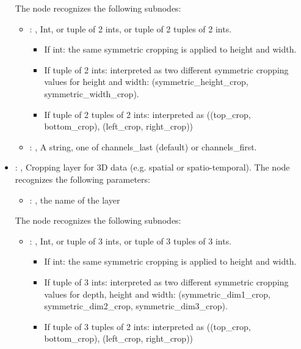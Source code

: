 \begin{itemize}
      The  node recognizes the following subnodes:
      \begin{itemize}
        \item {}: , 
          Int, or tuple of 2 ints, or tuple of 2 tuples of 2 ints.         \begin{itemize}
          \item If int: the same symmetric cropping is applied to height and width.           \item
          If tuple of 2 ints: interpreted as two different symmetric cropping values for height and
          width:             (symmetric\_height\_crop, symmetric\_width\_crop).           \item If
          tuple of 2 tuples of 2 ints: interpreted as ((top\_crop, bottom\_crop), (left\_crop,
          right\_crop))         \end{itemize}

        \item {}: , 
          A string, one of channels\_last (default) or channels\_first.
      \end{itemize}

    \item {}: , 
      Cropping layer for 3D data (e.g. spatial or spatio-temporal).
      The  node recognizes the following parameters:
        \begin{itemize}
          \item {}: , 
            the name of the layer
      \end{itemize}

      The  node recognizes the following subnodes:
      \begin{itemize}
        \item {}: , 
          Int, or tuple of 3 ints, or tuple of 3 tuples of 3 ints.         \begin{itemize}
          \item If int: the same symmetric cropping is applied to height and width.           \item
          If tuple of 3 ints: interpreted as two different symmetric cropping values for depth,
          height and width:             (symmetric\_dim1\_crop, symmetric\_dim2\_crop,
          symmetric\_dim3\_crop).           \item If tuple of 3 tuples of 2 ints: interpreted as
          ((top\_crop, bottom\_crop), (left\_crop, right\_crop))         \end{itemize}


\end{itemize}
\end{itemize}
